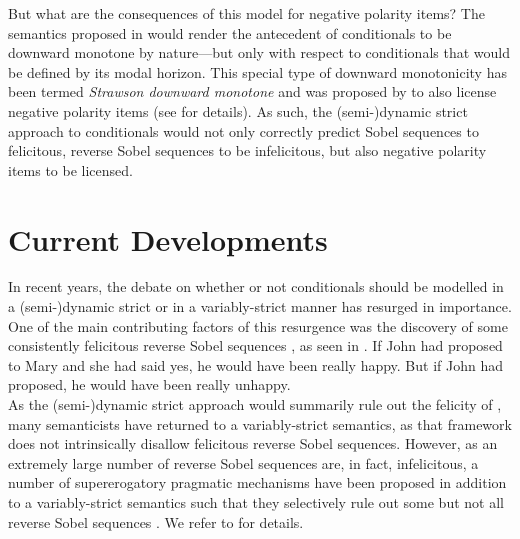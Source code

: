 But what are the consequences of this model for negative polarity items? The semantics proposed in  would render the antecedent of conditionals to be downward monotone by nature---but only with respect to conditionals that would be defined by its modal horizon. This special type of downward monotonicity has been termed \textit{Strawson downward monotone} and was proposed by \textcite{Fintel1999} to also license negative polarity items (see  for details). As such, the (semi-)dynamic strict approach to conditionals would not only correctly predict Sobel sequences to felicitous, reverse Sobel sequences to be infelicitous, but also negative polarity items to be licensed.


\section{Current Developments}
In recent years, the debate on whether or not conditionals should be modelled in a (semi-)dynamic strict or in a variably-strict manner has resurged in importance. One of the main contributing factors of this resurgence was the discovery of some consistently felicitous reverse Sobel sequences \parencite{Moss2012}, as seen in .
\pex\label{ex:moss-intro}
\a If John had proposed to Mary and she had said yes, he would have been really happy.
\a But if John had proposed, he would have been really unhappy.\\\emptyfill\parencite[p.~577]{Moss2012}
\xe
As the (semi-)dynamic strict approach would summarily rule out the felicity of , many semanticists have returned to a variably-strict semantics, as that framework does not intrinsically disallow felicitous reverse Sobel sequences. However, as an extremely large number of reverse Sobel sequences are, in fact, infelicitous, a number of supererogatory pragmatic mechanisms have been proposed in addition to a variably-strict semantics such that they selectively rule out some but not all reverse Sobel sequences \parencite{Moss2012,Klecha2011,Klecha2014,Klecha2015,Lewis2018,Krassnig2017,Krassnig2020}. We refer to  for details.


